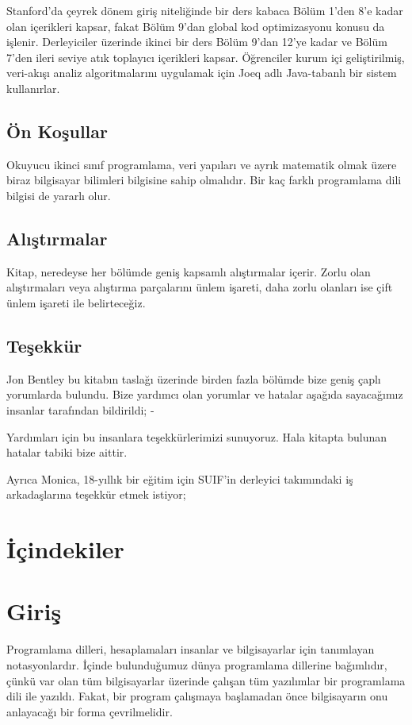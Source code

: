 \documentclass{book}
\renewcommand{\chaptername}{Bölüm}
\begin{document}
Stanford'da çeyrek dönem giriş niteliğinde bir ders kabaca Bölüm 1'den 8'e kadar olan içerikleri kapsar, fakat Bölüm 9'dan global kod optimizasyonu konusu da işlenir. Derleyiciler üzerinde ikinci bir ders Bölüm 9'dan 12'ye kadar ve Bölüm 7'den ileri seviye atık toplayıcı içerikleri kapsar. Öğrenciler kurum içi geliştirilmiş, veri-akışı analiz algoritmalarını uygulamak için {\selectfont 
Joeq
}adlı Java-tabanlı bir sistem kullanırlar.

\section*{Ön Koşullar}
Okuyucu ikinci sınıf programlama, veri yapıları ve ayrık matematik olmak üzere biraz bilgisayar bilimleri bilgisine sahip olmalıdır. Bir kaç farklı programlama dili bilgisi de yararlı olur.

\section*{Alıştırmalar}
Kitap, neredeyse her bölümde geniş kapsamlı alıştırmalar içerir. Zorlu olan alıştırmaları veya alıştırma parçalarını ünlem işareti, daha zorlu olanları ise çift ünlem işareti ile belirteceğiz.

\section*{Teşekkür}
Jon Bentley bu kitabın taslağı üzerinde birden fazla bölümde bize geniş çaplı yorumlarda bulundu. Bize yardımcı olan yorumlar ve hatalar aşağıda sayacağımız insanlar tarafından bildirildi;
-

Yardımları için bu insanlara teşekkürlerimizi sunuyoruz. Hala kitapta bulunan hatalar tabiki bize aittir.

Ayrıca Monica, 18-yıllık bir eğitim için SUIF'in derleyici takımındaki iş arkadaşlarına teşekkür etmek istiyor;
\newpage
\chapter*{İçindekiler}
\newpage

\pagestyle{myheadings}
\renewcommand{\chaptername}{Bölüm}

\chapter{Giriş}
Programlama dilleri, hesaplamaları insanlar ve bilgisayarlar için tanımlayan notasyonlardır. İçinde bulunduğumuz dünya programlama dillerine bağımlıdır, çünkü var olan tüm bilgisayarlar üzerinde çalışan tüm yazılımlar bir programlama dili ile yazıldı. Fakat, bir program çalışmaya başlamadan önce bilgisayarın onu anlayacağı bir forma çevrilmelidir.
\end{document}
